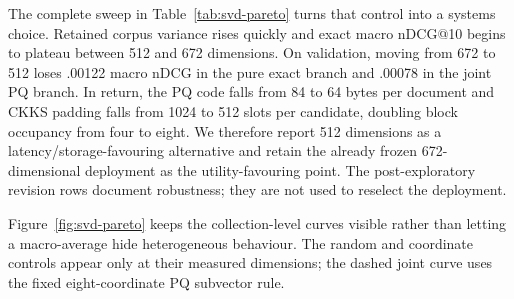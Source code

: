 \documentclass[pdflatex,sn-basic,Numbered]{sn-jnl}
\theoremstyle{plain}
\begin{document}
The complete sweep in Table~\ref{tab:svd-pareto} turns that control into a systems choice. Retained corpus variance rises quickly and exact macro nDCG@10 begins to plateau between 512 and 672 dimensions. On validation, moving from 672 to 512 loses .00122 macro nDCG in the pure exact branch and .00078 in the joint PQ branch. In return, the PQ code falls from 84 to 64 bytes per document and CKKS padding falls from 1024 to 512 slots per candidate, doubling block occupancy from four to eight. We therefore report 512 dimensions as a latency/storage-favouring alternative and retain the already frozen 672-dimensional deployment as the utility-favouring point. The post-exploratory revision rows document robustness; they are not used to reselect the deployment.

\begin{table}[t]
\caption{SVD dimension and joint storage Pareto macro-averaged over six BEIR collections. Exact is the pure nested-SVD branch. PQ+rerank fixes $M=d'/8$, seed 42, and $K=100$; it is therefore a joint projection/storage curve. ``Revision'' denotes the frozen post-exploratory subset.}\label{tab:svd-pareto}
\centering
\scriptsize
{}
\end{table}

Figure~\ref{fig:svd-pareto} keeps the collection-level curves visible rather than letting a macro-average hide heterogeneous behaviour. The random and coordinate controls appear only at their measured dimensions; the dashed joint curve uses the fixed eight-coordinate PQ subvector rule.
\end{document}
